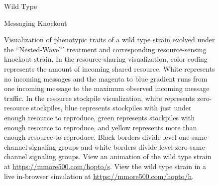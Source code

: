 \begin{figure}[!htbp]
\begin{center}
\vspace{1.0ex}

\hspace*{\fill}%
\begin{minipage}[t]{0.05\columnwidth}
\vspace{0pt} %
\end{minipage}%
\hfill
\begin{minipage}[t]{0.45\columnwidth}
\centering
\vspace{0pt} %
Wild Type
\end{minipage}%
\hfill
\begin{minipage}[t]{0.45\columnwidth}
\centering
\vspace{0pt} %
Messaging Knockout
\end{minipage}%
\hspace*{\fill}

\vspace{1.0ex}

\caption{
Visualization of phenotypic traits of a wild type strain evolved under the ``Nested-Wave''' treatment and corresponding resource-sensing knockout strain.
In the resource-sharing visualization, color coding represents the amount of incoming shared resource.
White represents no incoming messages and the magenta to blue gradient runs from one incoming message to the maximum observed incoming message traffic.
In the resource stockpile visualization, white represents zero-resource stockpiles, blue represents stockpiles with just under enough resource to reproduce, green represents stockpiles with enough resource to reproduce, and yellow represents more than enough resource to reproduce.
Black borders divide level-one same-channel signaling groups and white borders divide level-zero same-channel signaling groups.
View an animation of the wild type strain at \url{https://mmore500.com/hopto/s}.
View the wild type strain in a live in-browser simulation at \url{https://mmore500.com/hopto/h}.
}
\label{fig:ko-stockpiletrigger-sharing}
\end{center}
\end{figure}
